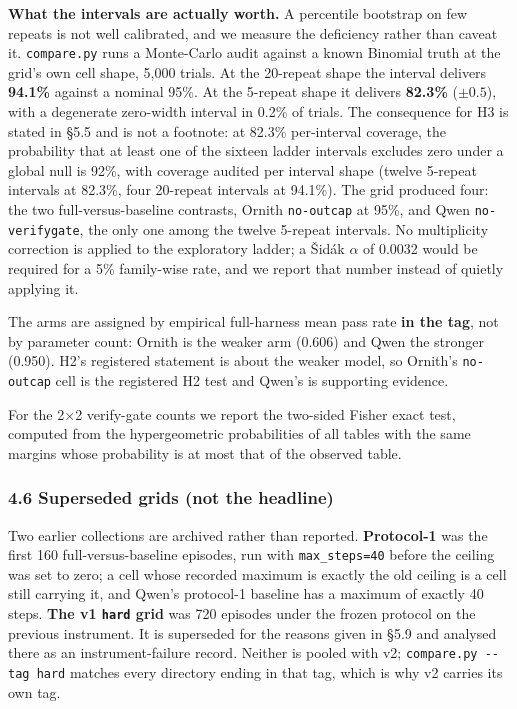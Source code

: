 \documentclass[
  10pt,
  a4paper,
]{article}
\let\oldtexttt\texttt
\renewcommand{\texttt}[1]{{\small\oldtexttt{#1}}}
\begin{document}
\textbf{What the intervals are actually worth.} A percentile bootstrap
on few repeats is not well calibrated, and we measure the deficiency
rather than caveat it. \texttt{compare.py} runs a Monte-Carlo audit
against a known Binomial truth at the grid's own cell shape, 5,000
trials. At the 20-repeat shape the interval delivers \textbf{94.1\%}
against a nominal 95\%. At the 5-repeat shape it delivers
\textbf{82.3\%} (\(\pm 0.5\)), with a degenerate zero-width interval in
0.2\% of trials. The consequence for H3 is stated in §5.5 and is not a
footnote: at 82.3\% per-interval coverage, the probability that at least
one of the sixteen ladder intervals excludes zero under a global null is
92\%, with coverage audited per interval shape (twelve 5-repeat
intervals at 82.3\%, four 20-repeat intervals at 94.1\%). The grid
produced four: the two full-versus-baseline contrasts, Ornith
\texttt{no-outcap} at 95\%, and Qwen \texttt{no-verifygate}, the only
one among the twelve 5-repeat intervals. No multiplicity correction is
applied to the exploratory ladder; a Šidák \(\alpha\) of 0.0032 would be
required for a 5\% family-wise rate, and we report that number instead
of quietly applying it.

The arms are assigned by empirical full-harness mean pass rate
\textbf{in the tag}, not by parameter count: Ornith is the weaker arm
(0.606) and Qwen the stronger (0.950). H2's registered statement is
about the weaker model, so Ornith's \texttt{no-outcap} cell is the
registered H2 test and Qwen's is supporting evidence.

For the 2×2 verify-gate counts we report the two-sided Fisher exact
test, computed from the hypergeometric probabilities of all tables with
the same margins whose probability is at most that of the observed
table.

\subsubsection{4.6 Superseded grids (not the
headline)}\label{superseded-grids-not-the-headline}

Two earlier collections are archived rather than reported.
\textbf{Protocol-1} was the first 160 full-versus-baseline episodes, run
with \texttt{max\_steps=40} before the ceiling was set to zero; a cell
whose recorded maximum is exactly the old ceiling is a cell still
carrying it, and Qwen's protocol-1 baseline has a maximum of exactly 40
steps. \textbf{The v1 \texttt{hard} grid} was 720 episodes under the
frozen protocol on the previous instrument. It is superseded for the
reasons given in §5.9 and analysed there as an instrument-failure
record. Neither is pooled with v2; \texttt{compare.py\ -\/-tag\ hard}
matches every directory ending in that tag, which is why v2 carries its
own tag.
\end{document}
